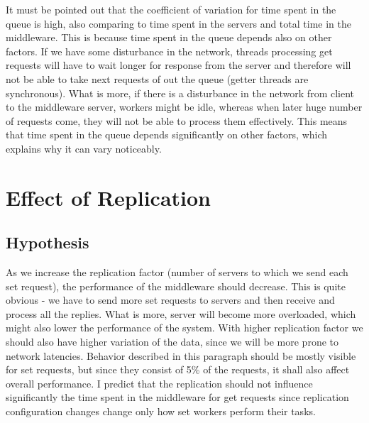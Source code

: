\documentclass[11pt]{article}
\DeclarePairedDelimiter{\ceil}{\lceil}{\rceil}
\begin{document}
It must be pointed out that the coefficient of variation for time spent in the queue is high, also comparing to time spent in the servers and total time in the middleware. This is because time spent in the queue depends also on other factors. If we have some disturbance in the network, threads processing get requests will have to wait longer for response from the server and therefore will not be able to take next requests of out the queue (getter threads are synchronous). What is more, if there is a disturbance in the network from client to the middleware server, workers might be idle, whereas when later huge number of requests come, they will not be able to process them effectively. This means that time spent in the queue depends significantly on other factors, which explains why it can vary noticeably.  

\clearpage


\section{Effect of Replication}
\label{sec:replication}

\subsection{Hypothesis}
\label{sec:replication-hyphotesis}

As we increase the replication factor (number of servers to which we send each set request), the performance of the middleware should decrease. This is quite obvious - we have to send more set requests to servers and then receive and process all the replies. What is more, server will become more overloaded, which might also lower the performance of the system. With higher replication factor we should also have higher variation of the data, since we will be more prone to network latencies. Behavior described in this paragraph should be mostly visible for set requests, but since they consist of 5\% of the requests, it shall also affect overall performance. I predict that the replication should not influence significantly the time spent in the middleware for get requests since replication configuration changes change only how set workers perform their tasks.
\end{document}
